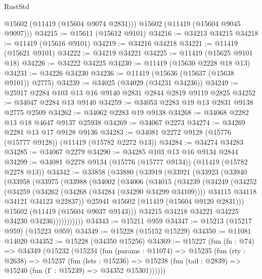 \begin{lexlean}{RustStd}
\begin{coremodule}
        @15602
        (@11419 (@15604 @9074 @2831)))
      @15602
      (@11419 (@15604 @9045 @9097)))
@34215 := @15611 (@15612 @9101)
@34216 := @34213 @34215
@34218 := @11419 (@15616 @9101)
@34219 := @34216 @34218
@34221 := @11419 (@15621 @9101)
@34222 := @34219 @34221
@34225 := @11419 (@15625 @9101 @18)
@34226 := @34222 @34225
@34230 := @11419 (@15630 @2228 @18 @13)
@34231 := @34226 @34230
@34236 := @11419 (@15636 (@15637 (@15638 @9101)) @2775)
@34239 := @34025 (@34029 (@34231 @34236))
@34249 := @25917 @2284 @103 @13 @16 @9140 @2831 @2844 @2819 @9119 @2825
@34252 := @34047 @2284 @13 @9140
@34259 := @34053 @2283 @19 @13 @2831 @9138 @2775 @2509
@34262 := @34062 @2283 @19 @9138
@34268 := @34068 @2282 @13 @18 @4647 @9137 @25938
@34269 := @34067 @2273
@34274 := @34269 @2281 @13 @17 @9128 @9136
@34283 := @34081 @2272 @9128 (@15776 (@15777 @9128)) (@11419 (@15782 @2272 @13))
@34284 := @34274 @34283
@34285 := @34067 @2279
@34290 := @34285 @103 @13 @16 @9134 @2844
@34299 := @34081 @2278 @9134 (@15776 (@15777 @9134)) (@11419 (@15782 @2278 @13))
@34342 := @33858
    (@33880
      (@33919
        (@33921
          (@33923
            (@33940
              (@33958
                (@33975
                  (@33988
                    (@34002
                      (@34006
                        (@34015
                          (@34239
                            (@34249
                              (@34252
                                (@34259
                                  (@34262 (@34268 (@34284 (@34290 @34299 @34109))))
                                  @34115
                                  @34118
                                  @34121
                                  @34123
                                  @22837))
                              @25941
                              @15602
                              (@11419 (@15604 @9120 @2831)))
                            @15602
                            (@11419 (@15604 @9037 @9143)))
                          @34215
                          @34218
                          @34221
                          @34225
                          @34230
                          @34236)))))))))))
@34343 := @15211 @959
@34347 := @15213 (@15217 @959) (@15223 @959)
@34349 := @15228 (@15152 @15229)
@34350 := @11081 @14020
@34352 := @15228 (@34350 @15256)
@34369 := @15227
    (fun (fn : @74) =>
    @34349
      (@15232
        (@15234
          (fun (params : @11074) =>
          @15235
            (fun (rty : @2638) =>
            @15237
              (fun (lets : @15236) =>
              @15238 (fun (tail : @2839) => @15240 (fun (Γ : @15239) => @34352 @15301))))))

\end{coremodule}
\end{lexlean}

